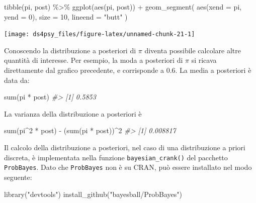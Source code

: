 \documentclass[
  11pt,
]{krantz}
\makeatletter
\newenvironment{Shaded}{\begin{snugshade}}{\end{snugshade}}
\newcommand{\AttributeTok}[1]{\textcolor[rgb]{0.61,0.61,0.61}{#1}}
\newcommand{\CommentTok}[1]{\textcolor[rgb]{0.37,0.37,0.37}{\textit{#1}}}
\newcommand{\DecValTok}[1]{\textcolor[rgb]{0.06,0.06,0.06}{#1}}
\newcommand{\FunctionTok}[1]{\textcolor[rgb]{0,0,0}{#1}}
\newcommand{\NormalTok}[1]{#1}
\newcommand{\SpecialCharTok}[1]{\textcolor[rgb]{0,0,0}{#1}}
\newcommand{\StringTok}[1]{\textcolor[rgb]{0.5,0.5,0.5}{#1}}
\newenvironment{kframe}{%
\medskip{}
\setlength{\fboxsep}{.8em}
 \def\at@end@of@kframe{}%
 \ifinner\ifhmode%
  \def\at@end@of@kframe{\end{minipage}}%
  \begin{minipage}{\columnwidth}%
 \fi\fi%
 \def\FrameCommand##1{\hskip\@totalleftmargin \hskip-\fboxsep
 \colorbox{shadecolor}{##1}\hskip-\fboxsep
     \hskip-\linewidth \hskip-\@totalleftmargin \hskip\columnwidth}%
 \MakeFramed {\advance\hsize-\width
   \@totalleftmargin\z@ \linewidth\hsize
   \@setminipage}}%
 {\par\unskip\endMakeFramed%
 \at@end@of@kframe}
\renewenvironment{Shaded}{\begin{kframe}}{\end{kframe}}
\theoremstyle{definition}
\theoremstyle{definition}
\theoremstyle{definition}
\theoremstyle{definition}
\theoremstyle{remark}
\makeatother
\begin{document}
\begin{Shaded}
\begin{Highlighting}[]
\FunctionTok{tibble}\NormalTok{(pi, post) }\SpecialCharTok{\%\textgreater{}\%}
  \FunctionTok{ggplot}\NormalTok{(}\FunctionTok{aes}\NormalTok{(pi, post)) }\SpecialCharTok{+}
  \FunctionTok{geom\_segment}\NormalTok{(}
    \FunctionTok{aes}\NormalTok{(}\AttributeTok{xend =}\NormalTok{ pi, }\AttributeTok{yend =} \DecValTok{0}\NormalTok{),}
    \AttributeTok{size =} \DecValTok{10}\NormalTok{, }\AttributeTok{lineend =} \StringTok{"butt"}
\NormalTok{  )}
\end{Highlighting}
\end{Shaded}

\begin{center}\texttt{[image: ds4psy\_files/figure-latex/unnamed-chunk-21-1]} \end{center}

Conoscendo la distribuzione a posteriori di \(\pi\) diventa possibile calcolare altre quantità di interesse. Per esempio, la moda a posteriori di \(\pi\) si ricava direttamente dal grafico precedente, e corrisponde a 0.6. La media a posteriori è data da:

\begin{Shaded}
\begin{Highlighting}[]
\FunctionTok{sum}\NormalTok{(pi }\SpecialCharTok{*}\NormalTok{ post)}
\CommentTok{\#\textgreater{} [1] 0.5853}
\end{Highlighting}
\end{Shaded}

La varianza della distribuzione a posteriori è

\begin{Shaded}
\begin{Highlighting}[]
\FunctionTok{sum}\NormalTok{(pi}\SpecialCharTok{\^{}}\DecValTok{2} \SpecialCharTok{*}\NormalTok{ post) }\SpecialCharTok{{-}}\NormalTok{ (}\FunctionTok{sum}\NormalTok{(pi }\SpecialCharTok{*}\NormalTok{ post))}\SpecialCharTok{\^{}}\DecValTok{2}
\CommentTok{\#\textgreater{} [1] 0.008817}
\end{Highlighting}
\end{Shaded}

Il calcolo della distribuzione a posteriori, nel caso di una distribuzione a priori discreta, è implementata nella funzione \texttt{bayesian\_crank()} del pacchetto \texttt{ProbBayes}. Dato che \texttt{ProbBayes} non è su CRAN, può essere installato nel modo seguente:

\begin{Shaded}
\begin{Highlighting}[]
\FunctionTok{library}\NormalTok{(}\StringTok{"devtools"}\NormalTok{)}
\FunctionTok{install\_github}\NormalTok{(}\StringTok{"bayesball/ProbBayes"}\NormalTok{)}
\end{Highlighting}
\end{Shaded}
\end{document}
